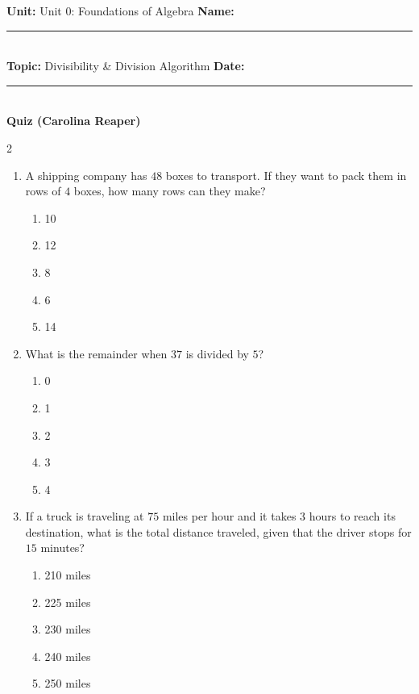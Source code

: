 \documentclass[10pt]{article}
\begin{document}
\enlargethispage{2.5cm}

\begin{tcolorbox}[colback=mainblue!5, colframe=mainblue, sharp corners, boxrule=0.5pt]
    \small \textbf{Unit:} Unit 0: Foundations of Algebra \hfill \textbf{Name:} \rule{3cm}{0.4pt} \\
    \small \textbf{Topic:} Divisibility & Division Algorithm \hfill \textbf{Date:} \rule{2cm}{0.4pt} \\
    \centering \textbf{\large Quiz (Carolina Reaper)}
\end{tcolorbox}

\vspace{0.2cm}

\begin{multicols}{2}
\begin{enumerate}[label=\textbf{Q\arabic*.}, leftmargin=*, itemsep=6pt, parsep=0pt]

  \item \small A shipping company has $48$ boxes to transport. If they want to pack them in rows of $4$ boxes, how many rows can they make?
  \begin{enumerate}[label=(\Alph*), leftmargin=0.6cm, nosep, itemsep=2pt]
    \item 10
    \item 12
    \item 8
    \item 6
    \item 14
  \end{enumerate}

  \item \small What is the remainder when $37$ is divided by $5$?
  \begin{enumerate}[label=(\Alph*), leftmargin=0.6cm, nosep, itemsep=2pt]
    \item 0
    \item 1
    \item 2
    \item 3
    \item 4
  \end{enumerate}

  \item \small If a truck is traveling at $75$ miles per hour and it takes $3$ hours to reach its destination, what is the total distance traveled, given that the driver stops for $15$ minutes?
  \begin{enumerate}[label=(\Alph*), leftmargin=0.6cm, nosep, itemsep=2pt]
    \item 210 miles
    \item 225 miles
    \item 230 miles
    \item 240 miles
    \item 250 miles
  \end{enumerate}


\end{enumerate}
\end{multicols}
\end{document}
